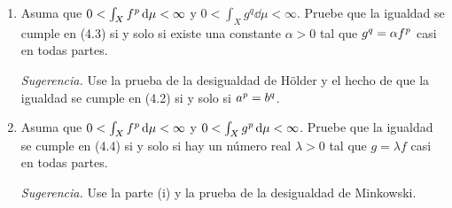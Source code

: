 \setcounter{neje}{1}
\begin{nejer}
\begin{enumerate}[label = (\roman*), leftmargin=1.5em]
    \item Asuma que $0 < \int_X f^{\operatorname{\textit{p}}} \dd{\mu} < \infty$ y $0 < \int_X g^q \dd{\mu} < \infty$. Pruebe que la igualdad se cumple en (4.3) si y solo si existe una constante $\alpha > 0$ tal que $g^q = \alpha f^{\operatorname{\textit{p}}}$ casi en todas partes.\par \emph{Sugerencia.} Use la prueba de la desigualdad de Hölder y el hecho de que la igualdad se cumple en (4.2) si y solo si $a^{\operatorname{\textit{p}}} = b^q$.
    \item Asuma que $0 < \int_X f^{\operatorname{\textit{p}}} \dd{\mu} < \infty$ y $0 < \int_X g^{\operatorname{\textit{p}}} \dd{\mu} < \infty$. Pruebe que la igualdad se cumple en (4.4) si y solo si hay un número real $\lambda > 0$ tal que $g = \lambda f$ casi en todas partes.\par \emph{Sugerencia.} Use la parte (i) y la prueba de la desigualdad de Minkowski.
\end{enumerate}
\end{nejer}
